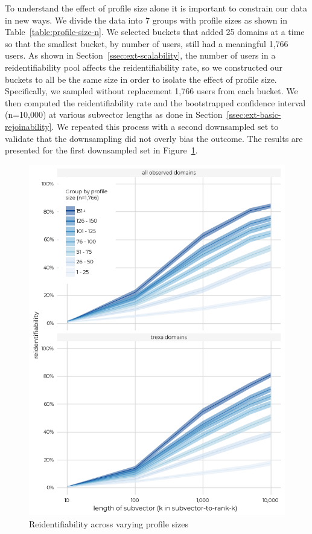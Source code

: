\documentclass[letterpaper,twocolumn,10pt]{article}
\begin{document}
To understand the effect of profile size alone it is important to constrain our data in new ways. We divide the data into 7 groups with profile sizes as shown in Table~\ref{table:profile-size-n}.
We selected buckets that added 25 domains at a time so that the smallest bucket, by number of users, still had a meaningful 1,766 users.
As shown in Section~\ref{ssec:ext-scalability}, the number of users in a reidentifiability pool affects the reidentifiability rate, so we constructed our buckets to all be the same size in order to isolate the effect of profile size.
Specifically, we sampled without replacement 1,766 users from each bucket.
We then computed the reidentifiability rate and the bootstrapped confidence interval (n=10,000) at various subvector lengths as done in Section~\ref{ssec:ext-basic-rejoinability}. 
We repeated this process with a second downsampled set to validate that the downsampling did not overly bias the outcome.
The results are presented for the first downsampled set in Figure~\ref{fig:rejoin-by-rank-by-group}.
%
\begin{figure}[htbp]
    \centering
    \includegraphics[width=0.9\linewidth]{figures/4-c2-1-rejoinability-by-rank-trexa-pioneer-subgroups.png}
    \caption{Reidentifiability across varying profile sizes}
    \label{fig:rejoin-by-rank-by-group}
\end{figure}
\end{document}
